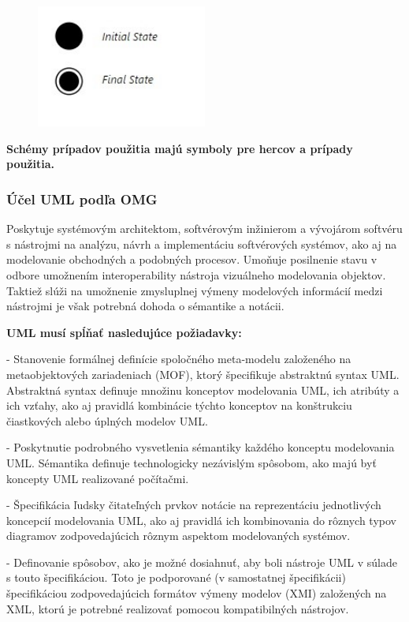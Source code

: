 \documentclass[a4paper]{feidippp}
\begin{document}
\begin{figure}[!ht]
\centering 
\includegraphics[width=0.5\textwidth]{dp7.jpg}
\end{figure}

\textbf{Schémy prípadov použitia majú symboly pre hercov a prípady použitia.}

\subsubsection{Účel UML podľa OMG}

Poskytuje  systémovým architektom, softvérovým inžinierom a vývojárom softvéru s nástrojmi na analýzu, návrh a implementáciu softvérových systémov, ako aj na modelovanie obchodných a podobných procesov.
Umoňuje posilnenie stavu v odbore umožnením interoperability nástroja vizuálneho modelovania objektov. Taktiež slúži na umožnenie zmysluplnej výmeny modelových informácií medzi nástrojmi je však potrebná dohoda o sémantike a notácii.


\textbf{UML musí spĺňať nasledujúce požiadavky:}

-	Stanovenie formálnej definície spoločného meta-modelu založeného na metaobjektových zariadeniach (MOF), ktorý špecifikuje abstraktnú syntax UML. Abstraktná syntax definuje množinu konceptov modelovania UML, ich atribúty a ich vzťahy, ako aj pravidlá kombinácie týchto konceptov na konštrukciu čiastkových alebo úplných modelov UML.

-	Poskytnutie podrobného vysvetlenia sémantiky každého konceptu modelovania UML. Sémantika definuje technologicky nezávislým spôsobom, ako majú byť koncepty UML realizované počítačmi.

-  Špecifikácia ľudsky čitateľných prvkov notácie na reprezentáciu jednotlivých koncepcií modelovania UML, ako aj pravidlá ich kombinovania do rôznych typov diagramov zodpovedajúcich rôznym aspektom modelovaných systémov.

-  Definovanie spôsobov, ako je možné dosiahnuť, aby boli nástroje UML v súlade s touto špecifikáciou. Toto je podporované (v samostatnej špecifikácii) špecifikáciou zodpovedajúcich formátov výmeny modelov (XMI) založených na XML, ktorú je potrebné realizovať pomocou kompatibilných nástrojov.
\end{document}
